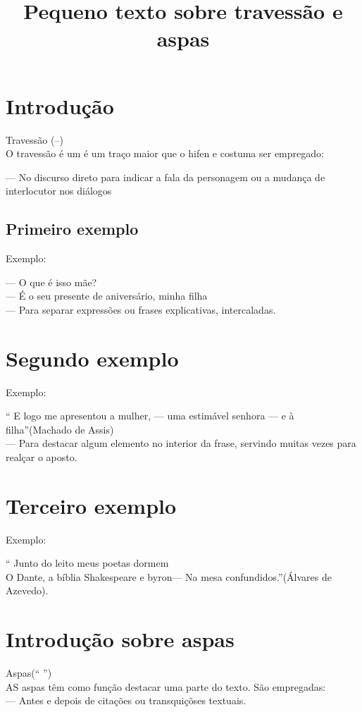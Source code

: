 \documentclass[12pt, article, oneside]{memoir}
\begin{document}
		
		
		\title{ Pequeno texto sobre travessão e aspas}
		\maketitle
		
		\tableofcontents
		\newpage
		\chapter{Introdução}	

		
			
			
		 Travessão (--)\\
		O travessão é um é um traço maior que o hifen e costuma ser empregado:
		
		--- No discurso direto para indicar a fala da personagem ou a mudança de interlocutor nos diálogos
		\section{Primeiro exemplo}
		
		Exemplo:
		
		--- O que é isso mãe?\\
		--- É o seu presente de aniversário, minha filha\\
		--- Para separar expressões ou frases explicativas, intercaladas.\\
		\chapter{Segundo exemplo}
		   Exemplo:
		   
		   `` E logo me apresentou a mulher, --- uma estimável senhora --- e à filha''(Machado de Assis)\\
		   --- Para destacar algum elemento no interior da frase, servindo muitas vezes para realçar o aposto.\\
		   \newpage
		  \chapter{Terceiro exemplo}
		   Exemplo:
		   
		   `` Junto do leito meus poetas dormem\\
		   O Dante, a bíblia Shakespeare e byron--- \newline
		   Na mesa confundidos.''(Álvares de Azevedo).
		   \newpage
		   \chapter{Introdução sobre aspas}
		  	\item Aspas(`` '')\\
		  	AS aspas têm como função destacar uma parte do texto. São empregadas:\\
		  	--- Antes e depois de citações ou transquiçõses textuais.
		  	\newpage
\end{document}
